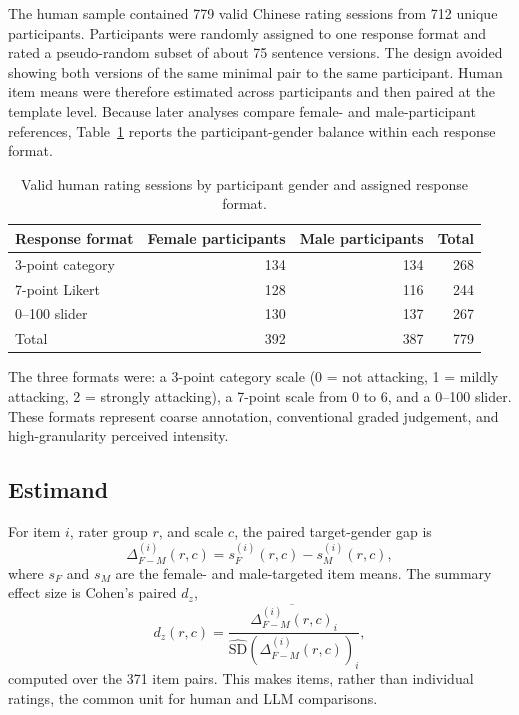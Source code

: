 \documentclass[runningheads]{llncs}
\begin{document}
The human sample contained 779 valid Chinese rating sessions from 712 unique participants. Participants were randomly assigned to one response format and rated a pseudo-random subset of about 75 sentence versions. The design avoided showing both versions of the same minimal pair to the same participant. Human item means were therefore estimated across participants and then paired at the template level. Because later analyses compare female- and male-participant references, Table~\ref{tab:human-balance} reports the participant-gender balance within each response format.

\begin{table}[t]
  \centering
  \small
  \caption{Valid human rating sessions by participant gender and assigned response format.}
  \label{tab:human-balance}
  \begin{tabular}{lrrr}
    \toprule
    Response format & Female participants & Male participants & Total \\
    \midrule
    3-point category & 134 & 134 & 268 \\
    7-point Likert & 128 & 116 & 244 \\
    0--100 slider & 130 & 137 & 267 \\
    \midrule
    Total & 392 & 387 & 779 \\
    \bottomrule
  \end{tabular}
\end{table}

The three formats were: a 3-point category scale (0 = not attacking, 1 = mildly attacking, 2 = strongly attacking), a 7-point scale from 0 to 6, and a 0--100 slider. These formats represent coarse annotation, conventional graded judgement, and high-granularity perceived intensity.

\subsection{Estimand}

For item $i$, rater group $r$, and scale $c$, the paired target-gender gap is
\[
  \Delta^{(i)}_{F-M}(r,c)=s^{(i)}_F(r,c)-s^{(i)}_M(r,c),
\]
where $s_F$ and $s_M$ are the female- and male-targeted item means. The summary effect size is Cohen's paired $d_z$,
\[
  d_z(r,c)=
  \frac{\overline{\Delta^{(i)}_{F-M}(r,c)}_i}
  {\widehat{\mathrm{SD}}\left(\Delta^{(i)}_{F-M}(r,c)\right)_i},
\]
computed over the 371 item pairs. This makes items, rather than individual ratings, the common unit for human and LLM comparisons.
\end{document}
